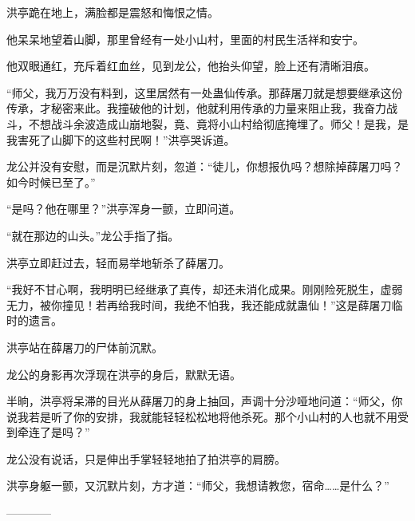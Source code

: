 \begin{this_body}
洪亭跪在地上，满脸都是震怒和悔恨之情。

他呆呆地望着山脚，那里曾经有一处小山村，里面的村民生活祥和安宁。

他双眼通红，充斥着红血丝，见到龙公，他抬头仰望，脸上还有清晰泪痕。

“师父，我万万没有料到，这里居然有一处蛊仙传承。那薛屠刀就是想要继承这份传承，才秘密来此。我撞破他的计划，他就利用传承的力量来阻止我，我奋力战斗，不想战斗余波造成山崩地裂，竟、竟将小山村给彻底掩埋了。师父！是我，是我害死了山脚下的这些村民啊！”洪亭哭诉道。

龙公并没有安慰，而是沉默片刻，忽道：“徒儿，你想报仇吗？想除掉薛屠刀吗？如今时候已至了。”

“是吗？他在哪里？”洪亭浑身一颤，立即问道。

“就在那边的山头。”龙公手指了指。

洪亭立即赶过去，轻而易举地斩杀了薛屠刀。

“我好不甘心啊，我明明已经继承了真传，却还未消化成果。刚刚险死脱生，虚弱无力，被你撞见！若再给我时间，我绝不怕我，我还能成就蛊仙！”这是薛屠刀临时的遗言。

洪亭站在薛屠刀的尸体前沉默。

龙公的身影再次浮现在洪亭的身后，默默无语。

半晌，洪亭将呆滞的目光从薛屠刀的身上抽回，声调十分沙哑地问道：“师父，你说我若是听了你的安排，我就能轻轻松松地将他杀死。那个小山村的人也就不用受到牵连了是吗？”

龙公没有说话，只是伸出手掌轻轻地拍了拍洪亭的肩膀。

洪亭身躯一颤，又沉默片刻，方才道：“师父，我想请教您，宿命……是什么？”

------------

\end{this_body}


